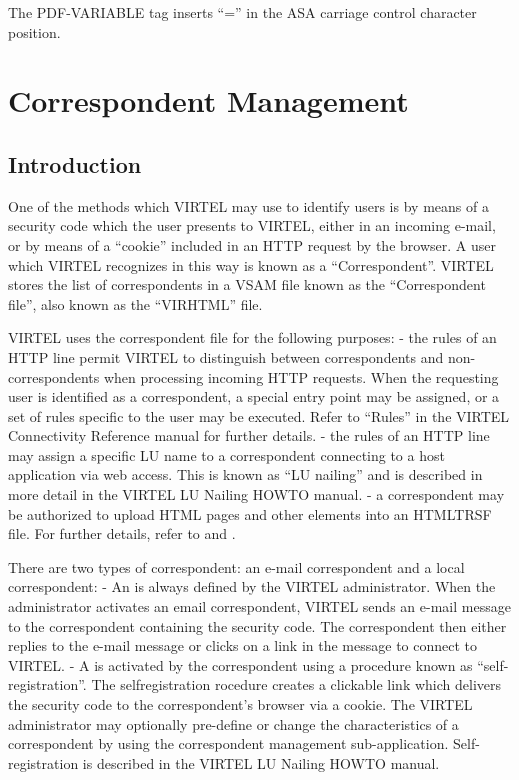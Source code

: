 \documentclass[letterpaper,10pt,english]{sphinxmanual}
\begin{document}
The PDF-VARIABLE tag inserts “=” in the ASA carriage control character position.


\section{Correspondent Management}
\label{\detokenize{User_Guide:v457ug-correspondent-management}}\label{\detokenize{User_Guide:correspondent-management}}

\subsection{Introduction}
\label{\detokenize{User_Guide:id2}}
One of the methods which VIRTEL may use to identify users is by means of a security code which the user presents to
VIRTEL, either in an incoming e-mail, or by means of a “cookie” included in an HTTP request by the browser. A user
which VIRTEL recognizes in this way is known as a “Correspondent”. VIRTEL stores the list of correspondents in a VSAM
file known as the “Correspondent file”, also known as the “VIRHTML” file.

VIRTEL uses the correspondent file for the following purposes:
- the rules of an HTTP line permit VIRTEL to distinguish between correspondents and non-correspondents when processing incoming HTTP requests. When the requesting user is identified as a correspondent, a special entry point may be assigned, or a set of rules specific to the user may be executed. Refer to “Rules” in the VIRTEL Connectivity Reference manual for further details.
- the rules of an HTTP line may assign a specific LU name to a correspondent connecting to a host application via web access. This is known as “LU nailing” and is described in more detail in the VIRTEL LU Nailing HOWTO manual.
- a correspondent may be authorized to upload HTML pages and other elements into an HTMLTRSF file. For further details, refer to {\hyperref[\detokenize{User_Guide:v457ug-http-uploading-pages-smtp}]{}} and {\hyperref[\detokenize{User_Guide:v457ug-http-uploading-pages}]{}}.

There are two types of correspondent: an e-mail correspondent and a local correspondent:
- An  is always defined by the VIRTEL administrator. When the administrator activates an email correspondent, VIRTEL sends an e-mail message to the correspondent containing the security code. The correspondent then either replies to the e-mail message or clicks on a link in the message to connect to VIRTEL.
- A  is activated by the correspondent using a procedure known as “self-registration”. The selfregistration rocedure creates a clickable link which delivers the security code to the correspondent’s browser via a cookie. The VIRTEL administrator may optionally pre-define or change the characteristics of a correspondent by using the correspondent management sub-application. Self-registration is described in the VIRTEL LU Nailing HOWTO manual.
\end{document}
